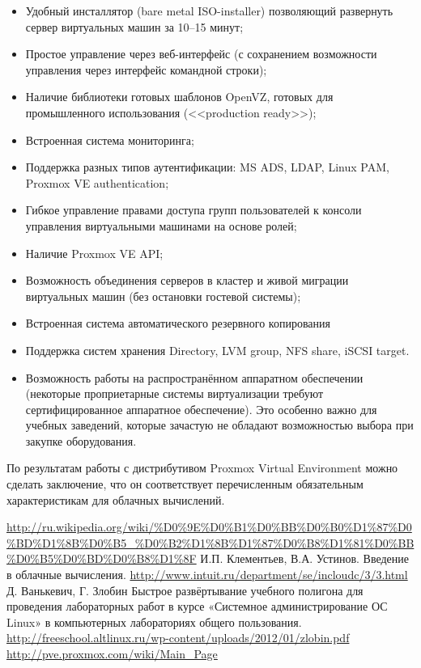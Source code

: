\documentclass[10pt, a5paper]{article}
\begin{document}
\begin{itemize}
  \item Удобный инсталлятор (bare metal ISO-installer) позволяющий развернуть сервер виртуальных машин за 10--15 минут;
  \item Простое управление через веб-интерфейс (с сохранением возможности управления через интерфейс командной строки);
  \item Наличие библиотеки готовых шаблонов OpenVZ, готовых для промышленного использования (<<production ready>>);
  \item Встроенная система мониторинга;
  \item Поддержка разных типов аутентификации: MS ADS, LDAP, Linux PAM, Proxmox VE authentication;
  \item Гибкое управление правами доступа групп пользователей к консоли управления виртуальными машинами на основе ролей;
  \item Наличие Proxmox VE API;
  \item Возможность объединения серверов в кластер и живой миграции виртуальных машин (без остановки гостевой системы);
  \item Встроенная система автоматического резервного копирования
  \item Поддержка систем хранения Directory, LVM group, NFS share, iSCSI target.
  \item Возможность работы на распространённом аппаратном обеспечении (некоторые проприетарные системы виртуализации требуют сертифицированное аппаратное обеспечение). Это особенно \linebreak важно для учебных заведений, которые зачастую не обладают возможностью выбора при закупке оборудования.
\end{itemize}

По результатам работы с дистрибутивом  Proxmox Virtual \linebreak Environment можно сделать заключение, что он  соответствует перечисленным обязательным характеристикам для облачных вычислений.


\begin{thebibliography}{9}
 \url{http://ru.wikipedia.org/wiki/\%D0\%9E\%D0\%B1\%D0\%BB\%D0\%B0\%D1\%87\%D0\%BD\%D1\%8B\%D0\%B5_\%D0\%B2\%D1\%8B\%D1\%87\%D0\%B8\%D1\%81\%D0\%BB\%D0\%B5\%D0\%BD\%D0\%B8\%D1\%8F}
 И.П. Клементьев, В.А. Устинов. Введение в облачные вычисления. \url{http://www.intuit.ru/department/se/incloudc/3/3.html}
 Д. Ванькевич, Г. Злобин Быстрое развёртывание учебного полигона для проведения лабораторных работ в курсе «Системное администрирование ОС Linux» в компьютерных лабораториях общего пользования. \url{http://freeschool.altlinux.ru/wp-content/uploads/2012/01/zlobin.pdf}
 \url{http://pve.proxmox.com/wiki/Main\_Page}
\end{thebibliography}
\end{document}

